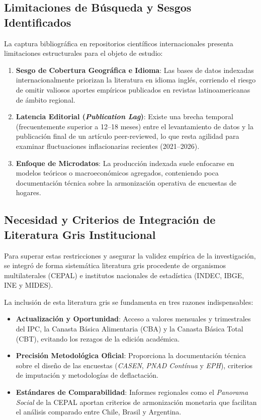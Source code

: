\subsection{Limitaciones de Búsqueda y Sesgos Identificados}
La captura bibliográfica en repositorios científicos internacionales presenta limitaciones estructurales para el objeto de estudio:
\begin{enumerate}
    \item \textbf{Sesgo de Cobertura Geográfica e Idioma}: Las bases de datos indexadas internacionalmente priorizan la literatura en idioma inglés, corriendo el riesgo de omitir valiosos aportes empíricos publicados en revistas latinoamericanas de ámbito regional.
    \item \textbf{Latencia Editorial (\textit{Publication Lag})}: Existe una brecha temporal (frecuentemente superior a 12--18 meses) entre el levantamiento de datos y la publicación final de un artículo peer-reviewed, lo que resta agilidad para examinar fluctuaciones inflacionarias recientes (2021--2026).
    \item \textbf{Enfoque de Microdatos}: La producción indexada suele enfocarse en modelos teóricos o macroeconómicos agregados, conteniendo poca documentación técnica sobre la armonización operativa de encuestas de hogares.
\end{enumerate}

\subsection{Necesidad y Criterios de Integración de Literatura Gris Institucional}
Para superar estas restricciones y asegurar la validez empírica de la investigación, se integró de forma sistemática literatura gris procedente de organismos multilaterales (CEPAL) e institutos nacionales de estadística (INDEC, IBGE, INE y MIDES).

La inclusión de esta literatura gris se fundamenta en tres razones indispensables:
\begin{itemize}
    \item \textbf{Actualización y Oportunidad}: Acceso a valores mensuales y trimestrales del IPC, la Canasta Básica Alimentaria (CBA) y la Canasta Básica Total (CBT), evitando los rezagos de la edición académica.
    \item \textbf{Precisión Metodológica Oficial}: Proporciona la documentación técnica sobre el diseño de las encuestas (\textit{CASEN}, \textit{PNAD Contínua} y \textit{EPH}), criterios de imputación y metodologías de deflactación.
    \item \textbf{Estándares de Comparabilidad}: Informes regionales como el \textit{Panorama Social} de la CEPAL aportan criterios de armonización monetaria que facilitan el análisis comparado entre Chile, Brasil y Argentina.
\end{itemize}

